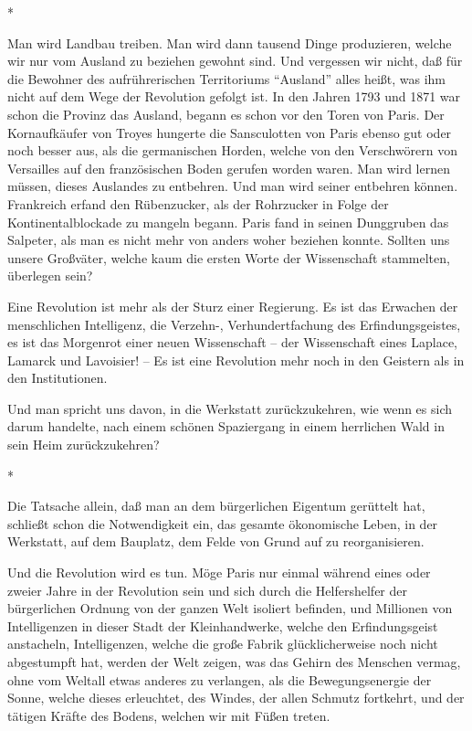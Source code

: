\documentclass{scrbook}
\begin{document}
\begin{center}*\end{center}

Man wird Landbau treiben. Man wird dann tausend Dinge produzieren, welche wir nur vom Ausland zu beziehen gewohnt sind. Und vergessen wir nicht, daß für die Bewohner des aufrührerischen Territoriums ``Ausland'' alles heißt, was ihm nicht auf dem Wege der Revolution gefolgt ist. In den Jahren 1793 und 1871 war schon die Provinz das Ausland, begann es schon vor den Toren von Paris. Der Kornaufkäufer von Troyes hungerte die Sansculotten von Paris ebenso gut oder noch besser aus, als die germanischen Horden, welche von den Verschwörern von Versailles auf den französischen Boden gerufen worden waren. Man wird lernen müssen, dieses Auslandes zu entbehren. Und man wird seiner entbehren können. Frankreich erfand den Rübenzucker, als der Rohrzucker in Folge der Kontinentalblockade zu mangeln begann. Paris fand in seinen Dunggruben das Salpeter, als man es nicht mehr von anders woher beziehen konnte. Sollten uns unsere Großväter, welche kaum die ersten Worte der Wissenschaft stammelten, überlegen sein?

Eine Revolution ist mehr als der Sturz einer Regierung. Es ist das Erwachen der menschlichen Intelligenz, die Verzehn-, Verhundertfachung des Erfindungsgeistes, es ist das Morgenrot einer neuen Wissenschaft – der Wissenschaft eines Laplace, Lamarck und Lavoisier! – Es ist eine Revolution mehr noch in den Geistern als in den Institutionen.

Und man spricht uns davon, in die Werkstatt zurückzukehren, wie wenn es sich darum handelte, nach einem schönen Spaziergang in einem herrlichen Wald in sein Heim zurückzukehren?

\begin{center}*\end{center}

Die Tatsache allein, daß man an dem bürgerlichen Eigentum gerüttelt hat, schließt schon die Notwendigkeit ein, das gesamte ökonomische Leben, in der Werkstatt, auf dem Bauplatz, dem Felde von Grund auf zu reorganisieren.

Und die Revolution wird es tun. Möge Paris nur einmal während eines oder zweier Jahre in der Revolution sein und sich durch die Helfershelfer der bürgerlichen Ordnung von der ganzen Welt isoliert befinden, und Millionen von Intelligenzen in dieser Stadt der Kleinhandwerke, welche den Erfindungsgeist anstacheln, Intelligenzen, welche die große Fabrik glücklicherweise noch nicht abgestumpft hat, werden der Welt zeigen, was das Gehirn des Menschen vermag, ohne vom Weltall etwas anderes zu verlangen, als die Bewegungsenergie der Sonne, welche dieses erleuchtet, des Windes, der allen Schmutz fortkehrt, und der tätigen Kräfte des Bodens, welchen wir mit Füßen treten.
\end{document}
